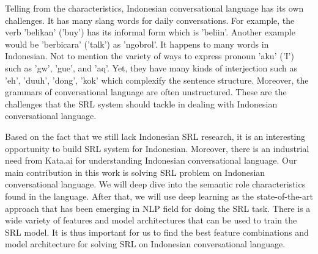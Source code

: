 Telling from the characteristics, Indonesian conversational language has its own challenges. It has many slang words for daily conversations. For example, the verb 'belikan' ('buy') has its informal form which is 'beliin'. Another example would be 'berbicara' ('talk') as 'ngobrol'. It happens to many words in Indonesian. Not to mention the variety of ways to express pronoun 'aku' ('I') such as 'gw', 'gue', and 'aq'. Yet, they have many kinds of interjection such as 'eh', 'duuh', 'dong', 'kok' which complexify the sentence structure. Moreover, the grammars of conversational language are often unstructured. These are the challenges that the SRL system should tackle in dealing with Indonesian conversational language.

Based on the fact that we still lack Indonesian SRL research, it is an interesting opportunity to build SRL system for Indonesian. Moreover, there is an industrial need from Kata.ai for understanding Indonesian conversational language. Our main contribution in this work is solving SRL problem on Indonesian conversational language. We will deep dive into the semantic role characteristics found in the language. After that, we will use deep learning as the state-of-the-art approach that has been emerging in NLP field for doing the SRL task. There is a wide variety of features and model architectures that can be used to train the SRL model. It is thus important for us to find the best feature combinations and model architecture for solving SRL on Indonesian conversational language.


